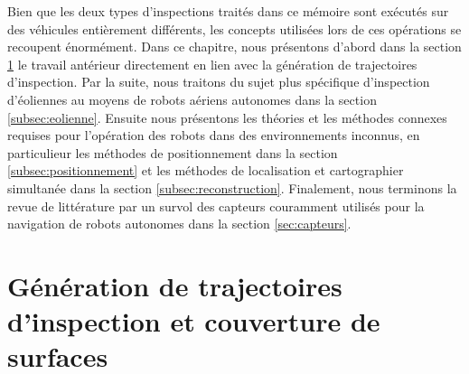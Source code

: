 \label{sec:RevLitt}
%

Bien que les deux types d'inspections traités dans ce mémoire sont exécutés sur des véhicules entièrement différents, les concepts utilisées lors de ces opérations se recoupent énormément. Dans ce chapitre, nous présentons d'abord dans la section \ref{subsec:generation} le travail antérieur directement en lien avec la génération de trajectoires d'inspection. Par la suite, nous traitons du sujet plus spécifique d'inspection d'éoliennes au moyens de robots aériens autonomes dans la section \ref{subsec:eolienne}. Ensuite nous présentons les théories et les méthodes connexes requises pour l'opération des robots dans des environnements inconnus, en particulieur les méthodes de positionnement dans la section \ref{subsec:positionnement} et les méthodes de localisation et cartographier simultanée dans la section \ref{subsec:reconstruction}. Finalement, nous terminons la revue de littérature par un survol des capteurs couramment utilisés pour la navigation de robots autonomes dans la section \ref{sec:capteurs}.

\section{Génération de trajectoires d'inspection et couverture de surfaces}\label{subsec:generation}

